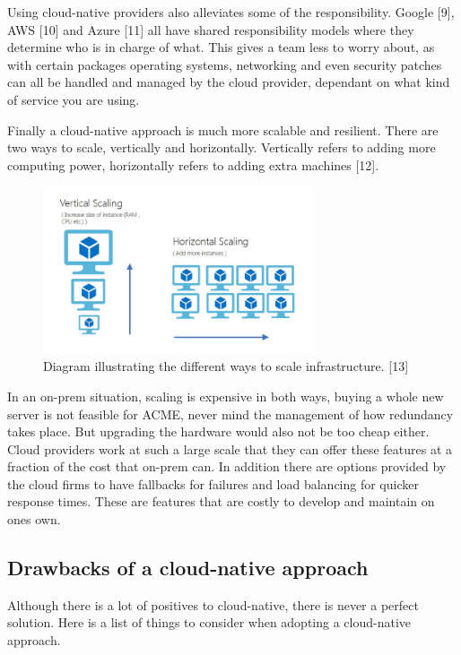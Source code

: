   Using cloud-native providers also alleviates some of the responsibility. Google [9], AWS [10] and Azure [11] all have shared responsibility models where 
  they determine who is in charge of what. This gives a team less to worry about, as with certain packages operating systems, networking and even 
  security patches can all be handled and managed by the cloud provider, dependant on what kind of service you are using.

  Finally a cloud-native approach is much more scalable and resilient. There are two ways to scale, vertically and horizontally.
  Vertically refers to adding more computing power, horizontally refers to adding extra machines [12].

  \begin{figure}[H]
    \centering
    \includegraphics[width=8cm]{assets/scalingOptions.jpg}
    \caption{Diagram illustrating the different ways to scale infrastructure. [13]}
    \label{fig:scalingOptions}
  \end{figure}

  In an on-prem situation, scaling is expensive in both ways, buying a whole new server is not feasible for ACME, never mind the management of how
  redundancy takes place. But upgrading the hardware would also not be too cheap either. Cloud providers work at such a large scale that they can offer
  these features at a fraction of the cost that on-prem can. In addition there are options provided by the cloud firms to have fallbacks for failures and 
  load balancing for quicker response times. These are features that are costly to develop and maintain on ones own. 

  \subsection{Drawbacks of a cloud-native approach}
  Although there is a lot of positives to cloud-native, there is never a perfect solution. Here is a list of things to consider when adopting a cloud-native
  approach.

